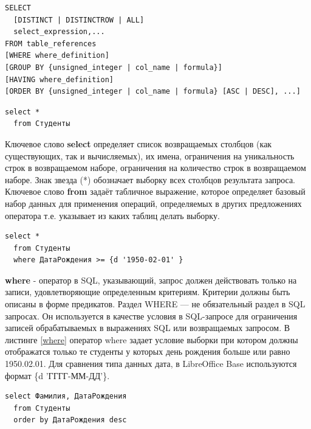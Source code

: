 \documentclass[a4paper]{article}
\begin{document}
\newpage
\begin{lstlisting}[label=select, caption=Базовая структура запроса]
SELECT
  [DISTINCT | DISTINCTROW | ALL]
  select_expression,...
FROM table_references
[WHERE where_definition]
[GROUP BY {unsigned_integer | col_name | formula}]
[HAVING where_definition]
[ORDER BY {unsigned_integer | col_name | formula} [ASC | DESC], ...]
\end{lstlisting}

\begin{lstlisting}[label=selection,caption=Выборка всех студентов]
  select *
  from Студенты
\end{lstlisting}

Ключевое слово \textbf{select} определяет список возвращаемых столбцов (как существующих, так и вычисляемых), их имена, ограничения на уникальность строк в возвращаемом наборе, ограничения на количество строк в возвращаемом наборе. Знак звезда (*) обозначает выборку всех столбцов результата запроса. Ключевое слово \textbf{from} задаёт табличное выражение, которое определяет базовый набор данных для применения операций, определяемых в других предложениях оператора т.е. указывает из каких таблиц делать выборку.

\newpage
\begin{lstlisting}[label=where, caption=Выборка студентов с датой рождения большей или равной условию]
  select *
  from Студенты
  where ДатаРождения >= {d '1950-02-01' }
\end{lstlisting}

\noindent\textbf{where} - оператор в SQL, указывающий, запрос должен действовать только на записи,
удовлетворяющие определенным критериям. Критерии должны быть описаны в форме предикатов. Раздел WHERE — не обязательный раздел в SQL запросах. Он используется в качестве условия в SQL-запросе для ограничения записей обрабатываемых в выражениях SQL или возвращаемых запросом. В листинге \ref{where} оператор where задает условие выборки при котором должны отображатся только те студенты у которых день рождения больше или равно 1950.02.01. Для сравнения типа данных дата, в LibreOffice Base используются формат \{d 'ГГГГ-ММ-ДД'\}.


\begin{lstlisting}[label=order, caption=Запрос фамилий и дат рождения студентов отсортированных по дате рождения]
  select Фамилия, ДатаРождения
  from Студенты
  order by ДатаРождения desc
\end{lstlisting}
\end{document}
